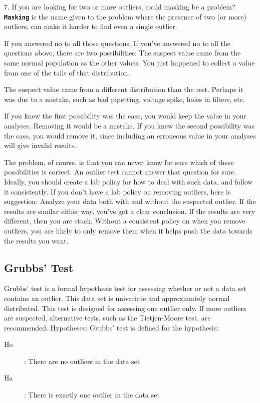 \documentclass[MdouleBmain.tex]{subfiles}
\begin{document}
7.	 If you are looking for two or more outliers, could masking be a problem?
\textbf{\texttt{Masking}} is the name given to the problem where the presence of two (or more) outliers, can make it harder to find even a single outlier.

If you answered no to all those questions.
If you've answered no to all the questions above, there are two possibilities:
The suspect value came from the same normal population as the other values. You just happened to collect a value from one of the tails of that distribution.
	
The suspect value came from a different distribution than the rest. Perhaps it was due to a mistake, such as bad pipetting, voltage spike, holes in filters, etc. 

If you knew the first possibility was the case, you would keep the value in your analyses. Removing it would be a mistake.
If you knew the second possibility was the case, you would remove it, since including an erroneous value in your analyses will give invalid results. 

The problem, of course, is that you can never know for sure which of these possibilities is correct. An outlier test cannot answer that question for sure. Ideally, you should create a lab policy for how to deal with such data, and follow it consistently.
If you don't have a lab policy on removing outliers, here is suggestion: Analyze your data both with and without the suspected outlier. If the results are similar either way, you've got a clear conclusion. If the results are very different, then you are stuck. Without a consistent policy on when you remove outliers, you are likely to only remove them when it helps push the data towards the results you want.


\subsection{Grubbs’ Test}
Grubbs' test is a formal hypothesis test for assessing whether or not a  data set contains an outlier.
This data set is univariate and approximately normal distributed. This test is designed for assessing one outlier only.  If more outliers are suspected, alternative tests, such as the Tietjen-Moore test, are recommended.
Hypotheses: Grubbs' test is defined for the hypothesis: 
\begin{description}
\item[Ho] :  There are no outliers in the data set  
\item[Ha] :  There is exactly one outlier in the data set  
\end{description}
\end{document}
